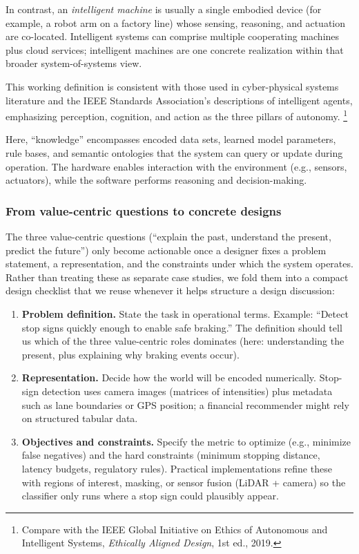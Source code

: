 In contrast, an \emph{intelligent machine} is usually a single embodied device (for example, a robot arm on a factory line) whose sensing, reasoning, and actuation are co-located. Intelligent systems can comprise multiple cooperating machines plus cloud services; intelligent machines are one concrete realization within that broader system-of-systems view.

This working definition is consistent with those used in cyber-physical systems literature and the
IEEE Standards Association's descriptions of intelligent agents, emphasizing perception, cognition,
and action as the three pillars of autonomy.%
\footnote{Compare with the IEEE Global Initiative on Ethics of Autonomous and Intelligent Systems, \emph{Ethically Aligned Design}, 1st ed., 2019.}

Here, ``knowledge'' encompasses encoded data sets, learned model parameters, rule bases, and
semantic ontologies that the system can query or update during operation. The hardware enables
interaction with the environment (e.g., sensors, actuators), while the software performs reasoning
and decision-making.

\subsubsection{From value-centric questions to concrete designs}
\label{sec:intro_from_value_centric_questions_to_concrete_designs_sub}

The three value-centric questions (``explain the past, understand the present, predict the future'') only become actionable once a designer fixes a problem statement, a representation, and the constraints under which the system operates. Rather than treating these as separate case studies, we fold them into a compact design checklist that we reuse whenever it helps structure a design discussion:
\begin{enumerate}
    \item \textbf{Problem definition.} State the task in operational terms. Example: ``Detect stop signs quickly enough to enable safe braking.'' The definition should tell us which of the three value-centric roles dominates (here: understanding the present, plus explaining why braking events occur).
    \item \textbf{Representation.} Decide how the world will be encoded numerically. Stop-sign detection uses camera images (matrices of intensities) plus metadata such as lane boundaries or GPS position; a financial recommender might rely on structured tabular data.
    \item \textbf{Objectives and constraints.} Specify the metric to optimize (e.g., minimize false negatives) and the hard constraints (minimum stopping distance, latency budgets, regulatory rules). Practical implementations refine these with regions of interest, masking, or sensor fusion (LiDAR + camera) so the classifier only runs where a stop sign could plausibly appear.
\end{enumerate}

